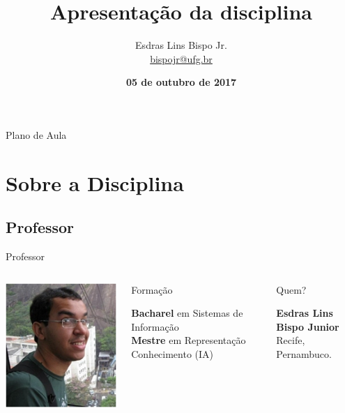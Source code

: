 \documentclass[xcolor=dvipsnames,table]{beamer}
\title{Apresentação da disciplina}
\author{
  Esdras Lins Bispo Jr. \\ \url{bispojr@ufg.br}
  }
\institute{
  Teoria da Computação \\Bacharelado em Ciência da Computação}
\date{\textbf{05 de outubro de 2017} }
\begin{document}
	\begin{frame}
		\titlepage
	\end{frame}

	\AtBeginSection{
		\begin{frame}{Sumário}%
    		\tableofcontents[currentsection]
		\end{frame}
	}

	\begin{frame}{Plano de Aula}
		\tableofcontents
	\end{frame}
	
	\section{Sobre a Disciplina}
	\subsection{Professor}
	\begin{frame}{Professor}
		\begin{columns}
		  		\begin{center}
		    		\includegraphics[height=.5\textheight]{images/esdras.png}
		  		\end{center}
				\begin{block}{Formação}
					\begin{center}
						{\normalsize {\bf Bacharel} em Sistemas de Informação\\
						{\bf Mestre} em Representação Conhecimento (IA)}
					\end{center}
				\end{block}		  		
		  		\begin{block}{Quem?}
		  			\begin{center}
						{\bf Esdras Lins Bispo Junior} \\ Recife, Pernambuco.
					\end{center}
				\end{block}
		\end{columns}
	\end{frame}
	
\end{document}
